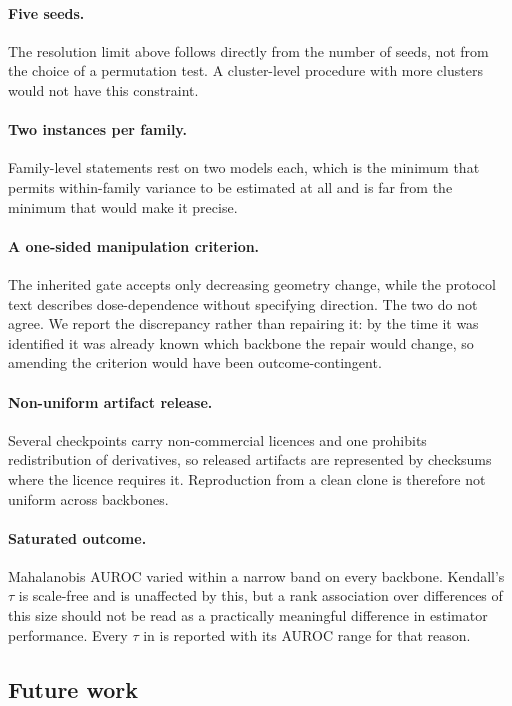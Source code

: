\documentclass[11pt,a4paper]{article}
\begin{document}
\paragraph{Five seeds.} The resolution limit above follows directly from the
number of seeds, not from the choice of a permutation test. A cluster-level
procedure with more clusters would not have this constraint.

\paragraph{Two instances per family.} Family-level statements rest on two models
each, which is the minimum that permits within-family variance to be estimated at
all and is far from the minimum that would make it precise.

\paragraph{A one-sided manipulation criterion.} The inherited gate accepts only
decreasing geometry change, while the protocol text describes dose-dependence
without specifying direction. The two do not agree. We report the discrepancy
rather than repairing it: by the time it was identified it was already known
which backbone the repair would change, so amending the criterion would have been
outcome-contingent.

\paragraph{Non-uniform artifact release.} Several checkpoints carry
non-commercial licences and one prohibits redistribution of derivatives, so
released artifacts are represented by checksums where the licence requires it.
Reproduction from a clean clone is therefore not uniform across backbones.

\paragraph{Saturated outcome.} Mahalanobis AUROC varied within a narrow band on
every backbone. Kendall's $\tau$ is scale-free and is unaffected by this, but a
rank association over differences of this size should not be read as a
practically meaningful difference in estimator performance. Every $\tau$ in
 is reported with its AUROC range for that reason.

\subsection{Future work}
\end{document}
